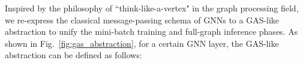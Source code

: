 \documentclass[conference]{IEEEtran}
\begin{document}

Inspired by the philosophy\cite{b22} of ``think-like-a-vertex" in the graph processing field, we re-express the classical message-passing schema of GNNs to a GAS-like abstraction to unify the mini-batch training and full-graph inference phases.
As shown in Fig.~\ref{fig:gas_abstraction}, for a certain GNN layer, the GAS-like abstraction can be defined as follows: 
\end{document}
